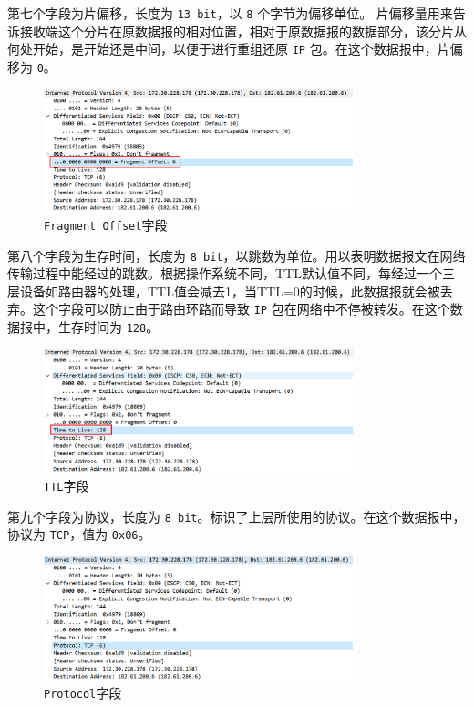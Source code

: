 \documentclass{article}
\begin{document}
第七个字段为片偏移，长度为 \texttt{13 bit}，以 \texttt{8} 个字节为偏移单位。 片偏移量用来告诉接收端这个分片在原数据报的相对位置，相对于原数据报的数据部分，该分片从何处开始，是开始还是中间，以便于进行重组还原 \texttt{IP} 包。在这个数据报中，片偏移为 \texttt{0}。

\begin{figure}[H]
  \centering
  \includegraphics[width=0.8\textwidth]{img/15_2.png}
  \caption{\texttt{Fragment Offset}字段}
  \label{fig:14}
\end{figure}

第八个字段为生存时间，长度为 \texttt{8 bit}，以跳数为单位。用以表明数据报文在网络传输过程中能经过的跳数。根据操作系统不同，TTL默认值不同，每经过一个三层设备如路由器的处理，TTL值会减去1，当TTL=0的时候，此数据报就会被丢弃。这个字段可以防止由于路由环路而导致 \texttt{IP} 包在网络中不停被转发。在这个数据报中，生存时间为 \texttt{128}。

\begin{figure}[H]
  \centering
  \includegraphics[width=0.8\textwidth]{img/16.png}
  \caption{\texttt{TTL}字段}
  \label{fig:15}
\end{figure}

第九个字段为协议，长度为 \texttt{8 bit}。标识了上层所使用的协议。在这个数据报中，协议为 \texttt{TCP}，值为 \texttt{0x06}。

\begin{figure}[H]
  \centering
  \includegraphics[width=0.8\textwidth]{img/17.png}
  \caption{\texttt{Protocol}字段}
  \label{fig:16}
\end{figure}
\end{document}
